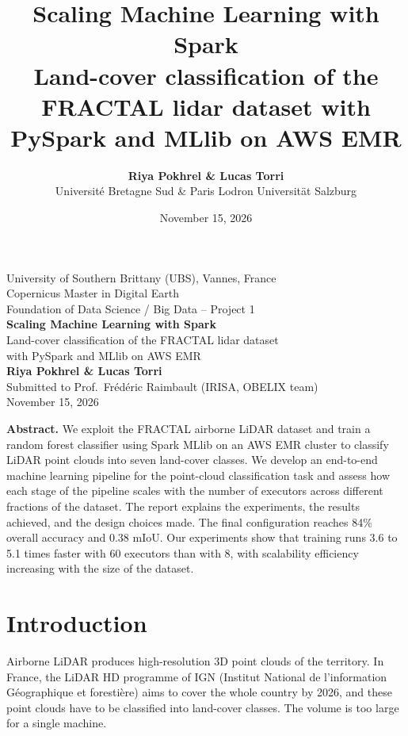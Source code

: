 \documentclass[a4paper, 11pt]{article} %
\title{\textbf{Scaling Machine Learning with Spark}\\[2mm]
	\large Land-cover classification of the FRACTAL lidar dataset with PySpark and MLlib on AWS EMR}
\author{\textbf{Riya Pokhrel \& Lucas Torri}\\
	Université Bretagne Sud \& Paris Lodron Universität Salzburg}
\date{November 15, 2026}
\begin{document}
\begin{titlepage}
\centering
\vspace*{1.5cm}
{\Large University of Southern Brittany (UBS), Vannes, France}\\[3mm]
Copernicus Master in Digital Earth\\
Foundation of Data Science / Big Data -- Project 1\\[2.5cm]
{\LARGE \textbf{Scaling Machine Learning with Spark}}\\[4mm]
{\large Land-cover classification of the FRACTAL lidar dataset\\ with PySpark and MLlib on AWS EMR}\\[2.5cm]
\textbf{Riya Pokhrel \& Lucas Torri}\\[2mm]
Submitted to Prof.\ Frédéric Raimbault (IRISA, OBELIX team)\\[2mm]
November 15, 2026\\[2cm]
\begin{minipage}{0.88\textwidth}
\small
\textbf{Abstract.}\;
We exploit the FRACTAL airborne LiDAR dataset and train a random forest classifier using Spark MLlib on an AWS EMR cluster to classify LiDAR point clouds into seven land-cover classes. We develop an end-to-end machine learning pipeline for the point-cloud classification task and assess how each stage of the pipeline scales with the number of executors across different fractions of the dataset. The report explains the experiments, the results achieved, and the design choices made. The final configuration reaches 84\% overall accuracy and 0.38 mIoU. Our experiments show that training runs 3.6 to 5.1 times faster with 60 executors than with 8, with scalability efficiency increasing with the size of the dataset.
\end{minipage}
\end{titlepage}

\section{Introduction}

Airborne LiDAR produces high-resolution 3D point clouds of the territory. In France, the LiDAR HD programme of IGN (Institut National de l'information Géographique et forestière) aims to cover the whole country by 2026, and these point clouds have to be classified into land-cover classes. The volume is too large for a single machine.
\end{document}
